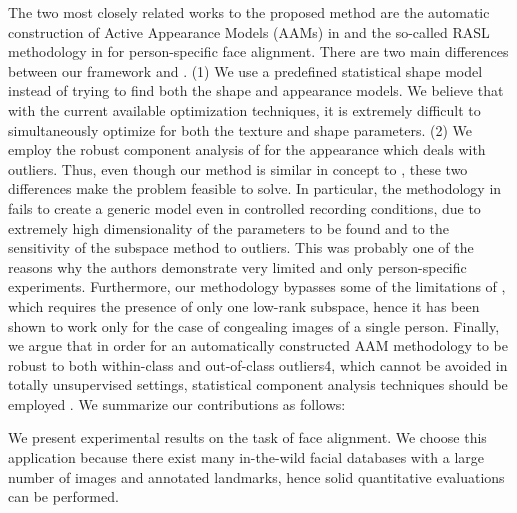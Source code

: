 The two most closely related works to the proposed
method are the automatic construction of Active Appearance
Models (AAMs) in \cite{?} and the so-called RASL
methodology in \cite{?} for person-specific face alignment.
There are two main differences between our framework
and \cite{?}. (1) We use a predefined statistical shape model
instead of trying to find both the shape and appearance models.
We believe that with the current available optimization
techniques, it is extremely difficult to simultaneously optimize
for both the texture and shape parameters. (2) We
employ the robust component analysis of \cite{?} for the appearance
which deals with outliers. Thus, even though
our method is similar in concept to \cite{?}, these two differences
make the problem feasible to solve. In particular, the
methodology in \cite{?} fails to create a generic model even in
controlled recording conditions, due to extremely high dimensionality
of the parameters to be found and to the sensitivity
of the subspace method to outliers. This was probably
one of the reasons why the authors demonstrate very
limited and only person-specific experiments. Furthermore,
our methodology bypasses some of the limitations of \cite{?},
which requires the presence of only one low-rank subspace,
hence it has been shown to work only for the case of congealing
images of a single person. Finally, we argue that
in order for an automatically constructed AAM methodology
to be robust to both within-class and out-of-class outliers4,
which cannot be avoided in totally unsupervised settings,
statistical component analysis techniques should be
employed \cite{?}. We summarize our contributions as follows:


We present experimental results on the task of face alignment.
We choose this application because there exist many
in-the-wild facial databases with a large number of images
and annotated landmarks, hence solid quantitative evaluations
can be performed.

\clearpage